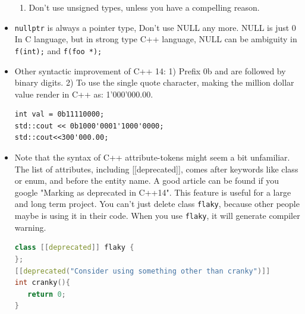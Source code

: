 \documentclass[a4paper,11pt,twoside]{book}
\begin{document}
\begin{itemize}
\begin{enumerate}
	\item Don't use unsigned types, unless you have a compelling reason.
\end{enumerate}

    \item \texttt{nullptr} is always a pointer type, Don't use NULL any more. NULL is just 0 In C language, but in strong type C++ language, NULL can be ambiguity in \texttt{f(int);} and \texttt{f(foo *);}

    \item Other syntactic improvement of C++ 14: 1) Prefix 0b and are followed by binary digits.  2) To use the single quote character, making the million dollar value render in C++ as: 1'000'000.00.
\begin{lstlisting}[numbers=none]
int val = 0b11110000;
std::cout << 0b1000'0001'1000'0000;
std::cout<<300'000.00;
\end{lstlisting}

    \item Note that the syntax of C++ attribute-tokens might seem a bit unfamiliar. The list of attributes, including [[deprecated]], comes after keywords like class or enum, and before the entity name. A good article can be found if you google "Marking as deprecated in C++14". This feature is useful for a large and long term project. You can't just delete class \texttt{flaky}, because other people maybe is using it in their code. When you use \texttt{flaky}, it will generate compiler warning.

\begin{lstlisting}[frame=single, language=c++]
class [[deprecated]] flaky {
};
[[deprecated("Consider using something other than cranky")]]
int cranky(){
   return 0;
}
\end{lstlisting}

\end{itemize}
\end{document}
